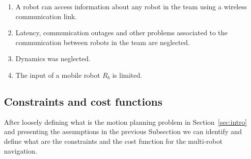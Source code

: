 \documentclass[eprint]{actapoly}
\begin{document}
\begin{enumerate}
    \item A robot can access 
    information about any robot in the team using 
    a wireless communication link.
    
    \item Latency, communication outages and other problems associated
    to the communication between robots in the team are neglected.
        
    \item Dynamics was neglected.
    
    \item The input of a mobile robot $R_b$ is limited.
    

%    

\end{enumerate}

\subsection{Constraints and cost functions}

After loosely defining what is the motion planning problem in
Section~\ref{sec:intro} and presenting the assumptions in the previous Subsection
we can identify and define what are the constraints and the cost function for the
multi-robot navigation.
\end{document}

